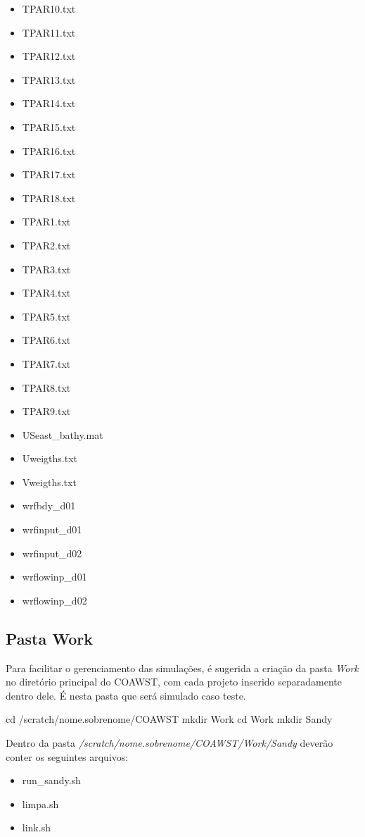 \begin{itemize}
\item TPAR10.txt
\item TPAR11.txt
\item TPAR12.txt
\item TPAR13.txt
\item TPAR14.txt
\item TPAR15.txt
\item TPAR16.txt
\item TPAR17.txt
\item TPAR18.txt
\item TPAR1.txt
\item TPAR2.txt
\item TPAR3.txt
\item TPAR4.txt
\item TPAR5.txt
\item TPAR6.txt
\item TPAR7.txt
\item TPAR8.txt
\item TPAR9.txt
\item USeast\_bathy.mat
\item Uweigths.txt
\item Vweigths.txt
\item wrfbdy\_d01
\item wrfinput\_d01
\item wrfinput\_d02
\item wrflowinp\_d01
\item wrflowinp\_d02
\end{itemize}
\bigskip

\subsection{Pasta Work}\label{workcoawstsec}
\bigskip

\noindent Para facilitar o gerenciamento das simulações, é sugerida a criação da pasta \textit{Work} no diretório principal do COAWST, com cada projeto inserido separadamente dentro dele. É nesta pasta que será simulado caso teste.
\bigskip

\begin{bashcode}
cd /scratch/nome.sobrenome/COAWST
mkdir Work
cd Work
mkdir Sandy
\end{bashcode}
\bigskip

\noindent Dentro da pasta \textit{/scratch/nome.sobrenome/COAWST/Work/Sandy} deverão conter os seguintes arquivos:
\bigskip

\begin{itemize}
\item run\_sandy.sh
\item limpa.sh
\item link.sh
\end{itemize}
\bigskip

